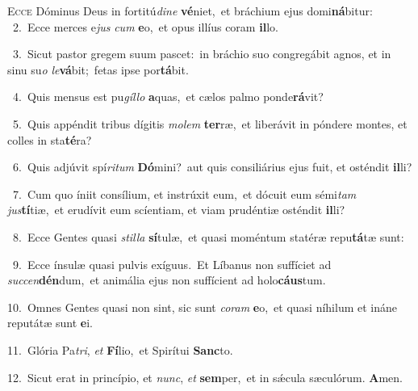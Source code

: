 \lettrine{\initial\textcolor{\initialcolor}{E}}{cce} Dóminus Deus in fortitú\-\textit{di}\-\textit{ne} \textbf{vé}\-niet,~\star et bráchium ejus domi\-\textbf{ná}\-bitur:\\
{\numbfont\textcolor{\numbcolor}{~2.}}~Ecce merces e\textit{jus} \textit{cum} \textbf{e}\-o,~\star et opus illíus coram \textbf{il}\-lo.\par
{\numbfont\textcolor{\numbcolor}{~3.}}~Sicut pastor gregem suum pascet:~\dagger in bráchio suo congregábit agnos, et in sinu su\textit{o} \textit{le}\-\textbf{vá}bit;~\star fetas ipse por\-\textbf{tá}\-bit.\par
{\numbfont\textcolor{\numbcolor}{~4.}}~Quis mensus est pu\-\textit{gíl}\-\textit{lo} \textbf{a}\-quas,~\star et cælos palmo ponde\-\textbf{rá}\-vit?\par
{\numbfont\textcolor{\numbcolor}{~5.}}~Quis appéndit tribus dígitis \textit{mo}\-\textit{lem} \textbf{ter}\-ræ,~\star et liberávit in póndere montes, et colles in sta\-\textbf{té}\-ra?\par
{\numbfont\textcolor{\numbcolor}{~6.}}~Quis adjúvit spí\-\textit{ri}\-\textit{tum} \textbf{Dó}\-mini?~\star aut quis consiliárius ejus fuit, et osténdit \textbf{il}\-li?\par
{\numbfont\textcolor{\numbcolor}{~7.}}~Cum quo íniit consílium, et instrúxit eum,~\dagger et dócuit eum sémi\textit{tam} \textit{jus}\-\textbf{tí}tiæ,~\star et erudívit eum scíentiam, et viam prudéntiæ osténdit \textbf{il}\-li?\par
{\numbfont\textcolor{\numbcolor}{~8.}}~Ecce Gentes quasi \textit{stil}\-\textit{la} \textbf{sí}\-tulæ,~\star et quasi moméntum statéræ repu\-\textbf{tá}\-tæ sunt:\par
{\numbfont\textcolor{\numbcolor}{~9.}}~Ecce ínsulæ quasi pulvis exíguus.~\dagger Et Líbanus non suffíciet ad \textit{suc}\-\textit{cen}\textbf{dén}dum,~\star et animália ejus non suffícient ad holo\-\textbf{cáus}\-tum.\par
{\numbfont\textcolor{\numbcolor}{10.}}~Omnes Gentes quasi non sint, sic sunt \textit{co}\-\textit{ram} \textbf{e}\-o,~\star et quasi níhilum et ináne reputátæ sunt \textbf{e}\-i.\par
{\numbfont\textcolor{\numbcolor}{11.}}~Glória Pa\-\textit{tri}\-, \textit{et} \textbf{Fí}\-lio,~\star et Spirítui \textbf{Sanc}\-to.\par
{\numbfont\textcolor{\numbcolor}{12.}}~Sicut erat in princípio, et \textit{nunc}\-, \textit{et} \textbf{sem}\-per,~\star et in sǽcula sæculórum. \textbf{A}\-men.\par
